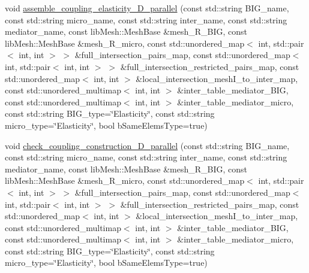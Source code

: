 \begin{DoxyCompactItemize}
\item 
void \hyperlink{classcarl_1_1assemble__coupling__matrices_ac8e2ab74817605feb97044d794fc04c9}{assemble\+\_\+coupling\+\_\+elasticity\+\_\+D\+\_\+parallel} (const std\+::string B\+I\+G\+\_\+name, const std\+::string micro\+\_\+name, const std\+::string inter\+\_\+name, const std\+::string mediator\+\_\+name, const lib\+Mesh\+::\+Mesh\+Base \&mesh\+\_\+\+R\+\_\+\+B\+I\+G, const lib\+Mesh\+::\+Mesh\+Base \&mesh\+\_\+\+R\+\_\+micro, const std\+::unordered\+\_\+map$<$ int, std\+::pair$<$ int, int $>$ $>$ \&full\+\_\+intersection\+\_\+pairs\+\_\+map, const std\+::unordered\+\_\+map$<$ int, std\+::pair$<$ int, int $>$ $>$ \&full\+\_\+intersection\+\_\+restricted\+\_\+pairs\+\_\+map, const std\+::unordered\+\_\+map$<$ int, int $>$ \&local\+\_\+intersection\+\_\+mesh\+I\+\_\+to\+\_\+inter\+\_\+map, const std\+::unordered\+\_\+multimap$<$ int, int $>$ \&inter\+\_\+table\+\_\+mediator\+\_\+\+B\+I\+G, const std\+::unordered\+\_\+multimap$<$ int, int $>$ \&inter\+\_\+table\+\_\+mediator\+\_\+micro, const std\+::string B\+I\+G\+\_\+type=\char`\"{}Elasticity\char`\"{}, const std\+::string micro\+\_\+type=\char`\"{}Elasticity\char`\"{}, bool b\+Same\+Elems\+Type=true)
\item 
void \hyperlink{classcarl_1_1assemble__coupling__matrices_ae3a145dae0e2d3f49b49da8c6d382f97}{check\+\_\+coupling\+\_\+construction\+\_\+D\+\_\+parallel} (const std\+::string B\+I\+G\+\_\+name, const std\+::string micro\+\_\+name, const std\+::string inter\+\_\+name, const std\+::string mediator\+\_\+name, const lib\+Mesh\+::\+Mesh\+Base \&mesh\+\_\+\+R\+\_\+\+B\+I\+G, const lib\+Mesh\+::\+Mesh\+Base \&mesh\+\_\+\+R\+\_\+micro, const std\+::unordered\+\_\+map$<$ int, std\+::pair$<$ int, int $>$ $>$ \&full\+\_\+intersection\+\_\+pairs\+\_\+map, const std\+::unordered\+\_\+map$<$ int, std\+::pair$<$ int, int $>$ $>$ \&full\+\_\+intersection\+\_\+restricted\+\_\+pairs\+\_\+map, const std\+::unordered\+\_\+map$<$ int, int $>$ \&local\+\_\+intersection\+\_\+mesh\+I\+\_\+to\+\_\+inter\+\_\+map, const std\+::unordered\+\_\+multimap$<$ int, int $>$ \&inter\+\_\+table\+\_\+mediator\+\_\+\+B\+I\+G, const std\+::unordered\+\_\+multimap$<$ int, int $>$ \&inter\+\_\+table\+\_\+mediator\+\_\+micro, const std\+::string B\+I\+G\+\_\+type=\char`\"{}Elasticity\char`\"{}, const std\+::string micro\+\_\+type=\char`\"{}Elasticity\char`\"{}, bool b\+Same\+Elems\+Type=true)
\end{DoxyCompactItemize}
